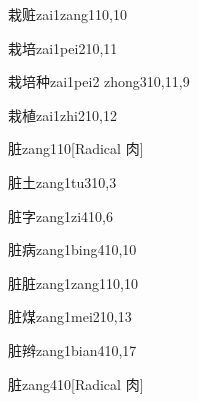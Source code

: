 \begin{verbete}{栽赃}{zai1zang1}{10,10}
\end{verbete}

\begin{verbete}{栽培}{zai1pei2}{10,11}
\end{verbete}

\begin{verbete}{栽培种}{zai1pei2 zhong3}{10,11,9}
\end{verbete}

\begin{verbete}{栽植}{zai1zhi2}{10,12}
\end{verbete}

\begin{verbete}{脏}{zang1}{10}[Radical 肉]
\end{verbete}

\begin{verbete}{脏土}{zang1tu3}{10,3}
\end{verbete}

\begin{verbete}{脏字}{zang1zi4}{10,6}
\end{verbete}

\begin{verbete}{脏病}{zang1bing4}{10,10}
\end{verbete}

\begin{verbete}{脏脏}{zang1zang1}{10,10}
\end{verbete}

\begin{verbete}{脏煤}{zang1mei2}{10,13}
\end{verbete}

\begin{verbete}{脏辫}{zang1bian4}{10,17}
\end{verbete}

\begin{verbete}{脏}{zang4}{10}[Radical 肉]
\end{verbete}

